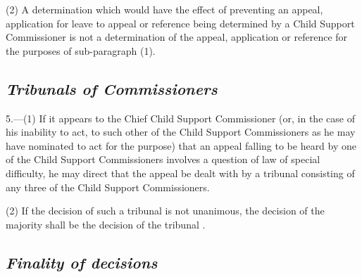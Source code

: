 \documentclass[12pt,a4paper]{article}
\begin{document}
(2) A determination which would have the effect of preventing an appeal, application for leave to appeal or reference being determined by a Child Support Commissioner is not a determination of the appeal, application or reference for the purposes of sub-paragraph (1).


\subsection*{\itshape Tribunals of Commissioners}

5.---(1) If it appears to the Chief Child Support Commissioner (or, in the case of his inability to act, to such other of the Child Support Commissioners as he may have nominated to act for the purpose) 
that an appeal 
%
falling to be heard by one of the Child Support Commissioners involves a question of law of special difficulty, he may direct 
that the appeal 
be dealt with by a tribunal consisting of any three 
of the Child Support Commissioners.

(2) If the decision of such a tribunal is not unanimous, the decision of the majority shall be the decision of the tribunal%
.



\subsection*{\itshape Finality of decisions}
\end{document}
